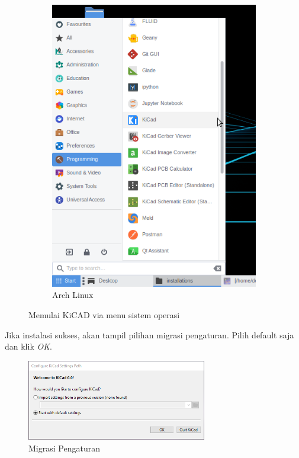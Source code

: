 \documentclass[12pt]{book}
\begin{document}
\begin{figure}[!ht]
\begin{subfigure}[t]{0.4\textwidth}
			\includegraphics[width=\textwidth]{images/installations/kicad_menu_linux}
			\caption{Arch Linux}
		\end{subfigure}
		\caption{Memulai KiCAD via menu sistem operasi}
	\end{figure}

	Jika instalasi sukses, akan tampil pilihan migrasi pengaturan.
	Pilih default saja dan klik \textit{OK}.

	\begin{figure}[!ht]
		\centering
		\includegraphics[width=0.7\textwidth]{images/installations/kicad_welcome}
		\caption{Migrasi Pengaturan}
	\end{figure}
\end{document}
